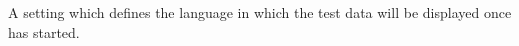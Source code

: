 \item[Default Language for Test Data]{
A setting which defines the language in which the test data will be 
displayed once \jb{} has started. 
}

